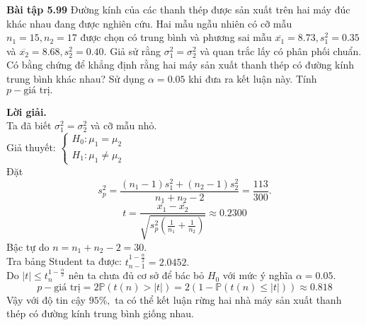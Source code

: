 \begin{mybox}
\textbf{Bài tập 5.99} Đường kính của các thanh thép được sản xuất trên hai máy đúc khác nhau đang được nghiên cứu. Hai mẫu ngẫu nhiên có cỡ mẫu $n_1 = 15, n_2 = 17$ được chọn có trung bình và phương sai mẫu $\overline{x_1} = 8.73, s_1^2 = 0.35$ và $\overline{x_2} = 8.68, s_2^2 = 0.40.$ Giả sử rằng $\sigma_1^2 = \sigma_2^2$ và quan trắc lấy có phân phối chuẩn. Có bằng chứng để khẳng định rằng hai máy sản xuất thanh thép có đường kính trung bình khác nhau? Sử dụng $\alpha = 0.05$ khi đưa ra kết luận này. Tính $p-\text{giá trị}.$
\end{mybox}
\textbf{Lời giải.}\\
Ta đã biết $\sigma_1^2 = \sigma_2^2 $ và cỡ mẫu nhỏ.\\
Giả thuyết: $\begin{cases}
H_0: \mu_1 = \mu_2\\
H_1: \mu_1 \ne \mu_2
\end{cases}$\\
Đặt $$s_p^2 = \frac{{\left( {{n_1} - 1} \right)s_1^2 + \left( {{n_2} - 1} \right)s_2^2}}{{{n_1} + {n_2} - 2}} = \frac{{113}}{{300}}.$$
$$t = \frac{{\overline {{x_1}}  - \overline {{x_2}} }}{{\sqrt {s_p^2\left( {\frac{1}{{{n_1}}} + \frac{1}{{{n_2}}}} \right)} }} \approx 0.2300$$
Bậc tự do $n = n_1 + n_2 - 2 = 30.$\\
Tra bảng Student ta được: $t_{n - 1}^{1 - \frac{\alpha}{2}} = 2.0452.$\\
Do $\left| t \right| \leqslant t_{n}^{1 - \frac{\alpha}{2}}$ nên ta chưa đủ cơ sở để bác bỏ $H_0$ với mức ý nghĩa $\alpha = 0.05.$\\
$$p-\text{giá trị} = 2\mathbb{P}\left( {t\left( n \right) > \left| t \right|} \right) = 2\left( {1 - \mathbb{P}\left( {t\left( n \right) \leqslant \left| t \right|} \right)} \right) \approx 0.818$$
Vậy với độ tin cậy $95\%,$ ta có thể kết luận rừng hai nhà máy sản xuất thanh thép có đường kính trung bình giống nhau.

